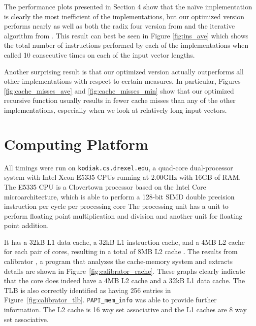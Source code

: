 \documentclass[11 pt]{article}
\begin{document}
The performance plots presented in Section 4 show that the na\"{i}ve 
implementation is clearly the most inefficient of the implementations, but our
optimized version performs nearly as well as both the radix four version 
from \cite{Chellappa:08} and the iterative algorithm from \cite{148286}.  This
result can best be seen in Figure \ref{fig:ins_ave} which shows the total 
number of instructions performed by each of the implementations when called
10 consecutive times on each of the input vector lengths.

Another surprising result is that our optimized version actually outperforms
all other implementations with respect to certain measures.  In particular, 
Figures \ref{fig:cache_misses_ave} and \ref{fig:cache_misses_min} show that 
our optimized recursive function usually results in fewer cache misses than any
of the other implementations, especially when we look at relatively long
input vectors.


\section{Computing Platform}
All timings were run on \texttt{kodiak.cs.drexel.edu}, a quad-core
dual-processor system with Intel Xeon E5335 CPUs running at 2.00GHz with 16GB
of RAM. The E5335 CPU is a Clovertown processor based on the Intel Core
microarchitecture, which is able to perform a 128-bit SIMD double precision
instruction per cycle per processing core \cite{intelcore} The processing unit
has a unit to perform floating point multiplication and division and another
unit for floating point addition.

It has a 32kB L1 data cache, a 32kB L1 instruction cache, and a 4MB L2 cache
for each pair of cores, resulting in a total of 8MB L2 cache
\cite{clovertown}. The results from calibrator \cite{calibrator}, a program
that analyzes the cache-memory system and extracts details are shown in
Figure~\ref{fig:calibrator_cache}. These graphs clearly indicate that the core
does indeed have a 4MB L2 cache and a 32kB L1 data cache. The TLB is also
correctly identified as having 256 entries in
Figure~\ref{fig:calibrator_tlb}. \texttt{PAPI\_mem\_info} \cite{papi} was able
to provide further information. The L2 cache is 16 way set associative and the
L1 caches are 8 way set associative.
\end{document}
